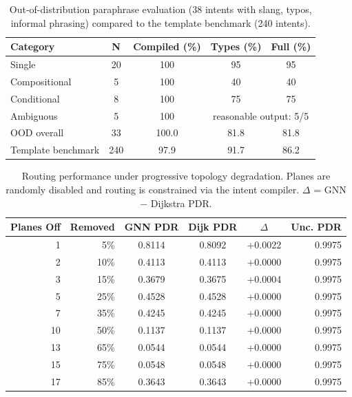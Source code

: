 \begin{table}[t]
\centering
\caption{Out-of-distribution paraphrase evaluation (38 intents with slang, typos, informal phrasing) compared to the template benchmark (240 intents).}
\label{tab:ood}
\begin{tabular}{lcccc}
\toprule
Category & N & Compiled (\%) & Types (\%) & Full (\%) \\
\midrule
Single & 20 & 100 & 95 & 95 \\
Compositional & 5 & 100 & 40 & 40 \\
Conditional & 8 & 100 & 75 & 75 \\
\midrule
Ambiguous & 5 & 100 & \multicolumn{2}{c}{reasonable output: 5/5} \\
\midrule
OOD overall & 33 & 100.0 & 81.8 & 81.8 \\
Template benchmark & 240 & 97.9 & 91.7 & 86.2 \\
\bottomrule
\end{tabular}
\end{table}

\begin{table}[t]
\centering
\caption{Routing performance under progressive topology degradation. Planes are randomly disabled and routing is constrained via the intent compiler. $\Delta$ = GNN $-$ Dijkstra PDR.}
\label{tab:topology_sweep}
\begin{tabular}{rrcccr}
\toprule
Planes Off & Removed & GNN PDR & Dijk PDR & $\Delta$ & Unc. PDR \\
\midrule
1 & 5\% & 0.8114 & 0.8092 & +0.0022 & 0.9975 \\
2 & 10\% & 0.4113 & 0.4113 & +0.0000 & 0.9975 \\
3 & 15\% & 0.3679 & 0.3675 & +0.0004 & 0.9975 \\
5 & 25\% & 0.4528 & 0.4528 & +0.0000 & 0.9975 \\
7 & 35\% & 0.4245 & 0.4245 & +0.0000 & 0.9975 \\
10 & 50\% & 0.1137 & 0.1137 & +0.0000 & 0.9975 \\
13 & 65\% & 0.0544 & 0.0544 & +0.0000 & 0.9975 \\
15 & 75\% & 0.0548 & 0.0548 & +0.0000 & 0.9975 \\
17 & 85\% & 0.3643 & 0.3643 & +0.0000 & 0.9975 \\
\bottomrule
\end{tabular}
\end{table}

